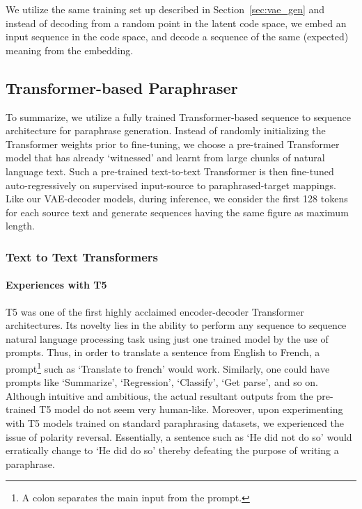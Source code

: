 \documentclass[11pt,a4paper]{article}
\begin{document}
We utilize the same training set up described in Section~\ref{sec:vae_gen} and instead of decoding from a random point in the latent code space, we embed an input sequence in the code space, and decode a sequence of the same (expected) meaning from the embedding.

\subsection{Transformer-based Paraphraser}
To summarize, we utilize a fully trained Transformer-based sequence to sequence architecture for paraphrase generation. Instead of randomly initializing the Transformer weights prior to fine-tuning, we choose a pre-trained Transformer model that has already `witnessed' and learnt from large chunks of natural language text. Such a pre-trained text-to-text Transformer is then fine-tuned auto-regressively on supervised input-source to paraphrased-target mappings. Like our VAE-decoder models, during inference, we consider the first 128 tokens for each source text and generate sequences having the same figure as maximum length.

\subsubsection{Text to Text Transformers}
\paragraph{Experiences with T5 \vspace{0.18cm}\\}
T5 \cite{T5} was one of the first highly acclaimed encoder-decoder Transformer architectures. Its novelty lies in the ability to perform any sequence to sequence natural language processing task using just one trained model by the use of prompts. Thus, in order to translate a sentence from English to French, a prompt\footnote{A colon separates the main input from the prompt.} such as `Translate to french' would work. Similarly, one could have prompts like `Summarize', `Regression', `Classify', `Get parse', and so on. Although intuitive and ambitious, the actual resultant outputs from the pre-trained T5 model do not seem very human-like. Moreover, upon experimenting with T5 models trained on standard paraphrasing datasets, we experienced the issue of polarity reversal. Essentially, a sentence such as `He did not do so' would erratically change to `He did do so' thereby defeating the purpose of writing a paraphrase.
\end{document}
